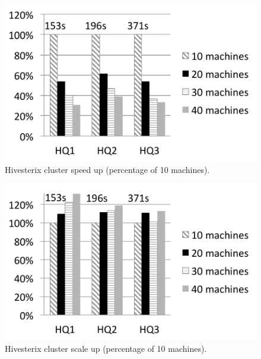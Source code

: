 \begin{figure}[!ht]
\includegraphics[width=\columnfigurewidth]{images/hivestrix_speed_up}
\centering
\vspace{-2ex}
\caption{Hivesterix cluster speed up (percentage of 10 machines).}
\label{fig:hivestrix_speed_up}
\end{figure}

\begin{figure}[!ht]
\includegraphics[width=\columnfigurewidth]{images/hivestrix_scale_up}
\centering
\vspace{-2ex}
\caption{Hivesterix cluster scale up (percentage of 10 machines).}
\label{fig:hivestrix_scale_up}
\end{figure}

